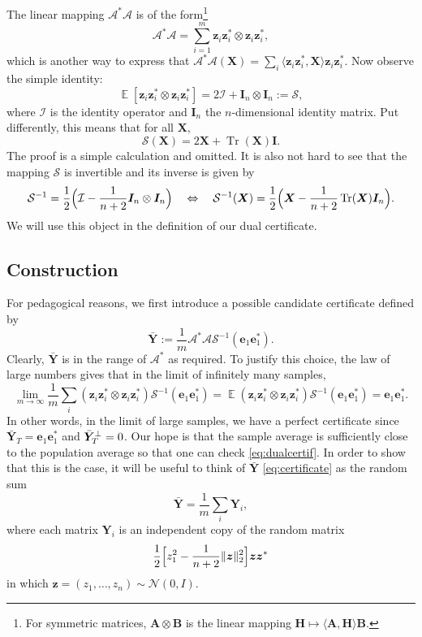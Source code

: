 \documentclass[11pt]{article}
\newcommand{\<}{\langle}
\renewcommand{\>}{\rangle}
\newcommand{\goto}{\rightarrow}
\newcommand{\E}{\operatorname{\mathbb{E}}}
\newcommand{\mtx}[1]{\bm{#1}}
\newcommand{\bX}{\bm{X}}
\newcommand{\bH}{\bm{H}}
\newcommand{\bI}{\bm{I}}
\newcommand{\bY}{\bm{Y}}
\newcommand{\be}{\bm{e}}
\newcommand{\bz}{\bm{z}}
\newcommand{\tr}{\operatorname{Tr}}
\numberwithin{equation}{section}
\newcommand{\cA}{\mathcal{A}}
\begin{document}
\newcommand{\cS}{\mathcal{S}}

The linear mapping $\cA^*\cA$ is of the form\footnote{For symmetric
  matrices, $\mtx{A} \otimes \mtx{B}$ is the linear mapping $\bH
  \mapsto \<\mtx{A}, \bH\> \mtx{B}$.}
\[
\cA^* \cA = \sum_{i =1}^m \bz_i \bz_i^* \otimes \bz_i \bz_i^*, 
\]
which is another way to express that $\cA^*\cA(\bX) = \sum_i \<\bz_i
\bz_i^*, \bX\> \bz_i \bz_i^*$.  Now observe the simple identity:
\begin{equation}
  \label{eq:EAtA}
  \E  [\bz_i \bz_i^* \otimes \bz_i \bz_i^*] = 
  2 \mathcal{I} + \bI_n \otimes \bI_n := \mathcal{S},
\end{equation}
where $\mathcal{I}$ is the identity operator and $\bI_n$ the
$n$-dimensional identity matrix.  Put differently, this means that for
all $\bX$,
\[
\cS(\bX) = 2\bX + \tr(\bX) \bI. 
\]
The proof is a simple calculation and omitted. It is also not hard to
see that the mapping $\cS$ is invertible and its inverse is given by
\[
\cS^{-1} = \frac12\Bigl(\mathcal{I} - \frac{1}{n+2} \bI_n \otimes \bI_n\Bigr)
\quad \Leftrightarrow \quad \cS^{-1}(\bX) = \frac12 \Bigl(\bX -
\frac{1}{n+2} \tr(\bX) \bI_n\Bigr). 
\]
We will use this object in the definition of our dual certificate. 

\subsection{Construction}

For pedagogical reasons, we first introduce a possible candidate
certificate defined by
\begin{equation}
  \label{eq:certificate}
  \bar{\bY} := \frac{1}{m} \cA^* \cA \cS^{-1}(\be_1 \be_1^*). 
\end{equation}
Clearly, $\bar{\bY}$ is in the range of $\cA^*$ as required. To justify this
choice, the law of large numbers gives that in the limit of infinitely
many samples, 
\[
\lim_{m \goto \infty} \frac{1}{m} \sum_i (\bz_i \bz_i^* \otimes \bz_i \bz_i^*)
\cS^{-1}(\be_1 \be_1^*) = \E (\bz_i \bz_i^* \otimes \bz_i \bz_i^*) \cS^{-1}(\be_1
\be_1^*) = \be_1 \be_1^*.
\]
In other words, in the limit of large samples, we have a perfect
certificate since $\bar{\bY}_T = \be_1 \be_1^*$ and $\bar{\bY}_\Tp =
0$. Our hope is that the sample average is sufficiently close to the
population average so that one can check \eqref{eq:dualcertif}. In
order to show that this is the case, it will be useful to think of
$\bar{\bY}$ \eqref{eq:certificate} as the random sum
\[
\bar{\bY} = \frac{1}{m} \sum_i \bY_i, 
\]
where each matrix $\bY_i$ is an independent copy of the random matrix 
\[
\frac12 \Bigl[z_1^2 - \frac{1}{n+2} \|\bz\|_2^2\Bigr] \bz \bz^*
\]
in which $\bz = (z_1, \ldots, z_n) \sim \mathcal{N}(0,I)$. 
\end{document}
